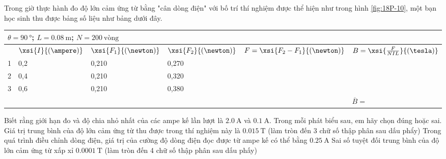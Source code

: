 \begin{ex}
	Trong giờ thực hành đo độ lớn cảm ứng từ bằng "cân dòng điện" với bố trí thí nghiệm được thể hiện như trong hình \ref{fig:18P-10}, một bạn học sinh thu được bảng số liệu như bảng dưới đây.
	\begin{center}
		\begin{tabular}{|M{2cm}|M{2cm}|M{2cm}|M{2cm}|M{4cm}|M{3.5cm}|}
			\hline
			\\
			\hline
			 & $\xsi{I}{\left(\ampere\right)}$ & $\xsi{F_1}{\left(\newton\right)}$ & $\xsi{F_2}{\left(\newton\right)}$ & $F=\xsi{F_2-F_1}{\left(\newton\right)}$ & $B=\xsi{\frac{F}{NIL}}{\left(\tesla\right)}$\\
			 & 0,2 & 0,210 & 0,270 &&\\
			 & 0,4 & 0,210 & 0,320 & &\\
			 & 0,6 & 0,210 & 0,380 & &\\
			\hline
			 &$\overline{B}=$\\
			\hline
			
		\end{tabular}
	\end{center}
	Biết rằng giới hạn đo và độ chia nhỏ nhất của các ampe kế lần lượt là $\SI{2.0}{\ampere}$ và $\SI{0.1}{\ampere}$. Trong mỗi phát biểu sau, em hãy chọn đúng hoặc sai.
	{Giá trị trung bình của độ lớn cảm ứng từ thu được trong thí nghiệm này là $\SI{0.015}{\tesla}$ (làm tròn đến 3 chữ số thập phân sau dấu phẩy)}
	{Trong quá trình điều chỉnh dòng điện, giá trị của cường độ dòng điện đọc được từ ampe kế có thể bằng $\SI{0.25}{\ampere}$}
	{Sai số tuyệt đối trung bình của độ lớn cảm ứng từ xấp xỉ $\SI{0.0001}{\tesla}$ (làm tròn đến 4 chữ số thập phân sau dấu phấy)}
\end{ex}
